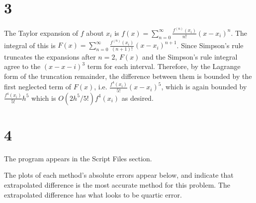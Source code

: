 \documentclass{article}
\begin{document}
\section*{3}
The Taylor expansion of $f$ about $x_i$ is $f(x) = \sum_{n=0}^\infty\frac{f^{(n)}(x_i)}{n!}(x-x_i)^n$. The integral of this is $F(x) =\sum_{n=0}^\infty\frac{f^{(n)}(x_i)}{(n+1)!}(x-x_i)^{n+1}$. Since Simpson's rule truncates the expansions after $n=2$, $F(x)$ and the Simpson's rule integral agree to the $(x-x-i)^3$ term for each interval. Therefore, by the Lagrange form of the truncation remainder, the difference between them is bounded by the first neglected term of $F(x)$, i.e. $\frac{f^4(x_i)}{5!}(x-x_i)^5$, which is again bounded by $\frac{f^4(x_i)}{5!}h^5$ which is $O(2h^5/5!)f^4(x_i)$ as desired.

\section*{4}
The program appears in the Script Files section.

The plots of each method's absolute errors appear below, and indicate that extrapolated difference is the most accurate method for this problem. The extrapolated difference has what looks to be quartic error.
\end{document}
